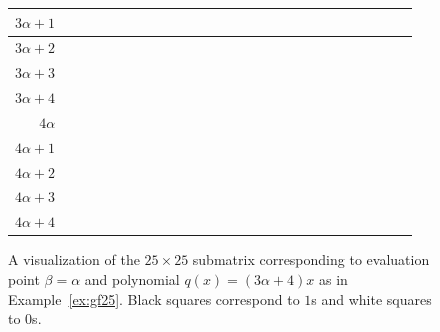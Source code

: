 \documentclass[11pt]{amsart}
\theoremstyle{definition}
\newcommand{\0}{\mathbf{0}}
\begin{document}
\begin{figure}[h]
{\begin{tabular}{r||c|c|c|c|c||c|c|c|c|c||c|c|c|c|c||c|c|c|c|c||c|c|c|c|c||}
            $3\alpha+1$ & & & & & & & & \cellcolor{black} & & & & & & & & & & & & & & & & & \\ \hline
            $3\alpha+2$ & & & & & & & & & \cellcolor{black} & & & & & & & & & & & & & & & & \\ \hline 
            $3\alpha+3$ & & & & & & & & & & \cellcolor{black} & & & & & & & & & & & & & & & \\ \hline
            $3\alpha+4$ & & & & & & \cellcolor{black} & & & & & & & & & & & & & & & & & & & \\ \hline \hline
            $4\alpha$   & & & & & & & & & & & & \cellcolor{black} & & & & & & & & & & & & & \\ \hline
            $4\alpha+1$ & & & & & & & & & & & & & \cellcolor{black} & & & & & & & & & & & & \\ \hline
            $4\alpha+2$ & & & & & & & & & & & & & & \cellcolor{black} & & & & & & & & & & & \\ \hline
            $4\alpha+3$ & & & & & & & & & & & & & & & \cellcolor{black} & & & & & & & & & & \\ \hline
            $4\alpha+4$ & & & & & & & & & & & \cellcolor{black} & & & & & & & & & & & & & & \\ \hline \hline
        \end{tabular}}
        \caption{A visualization of the $25 \times 25$ submatrix corresponding to evaluation point $\beta=\alpha$ and polynomial $q(x)=(3 \alpha + 4)x$ as in Example~\ref{ex:gf25}. Black squares correspond to $1$s and white squares to $0$s.} \label{fig:gf25}
    \end{figure}
\end{document}
